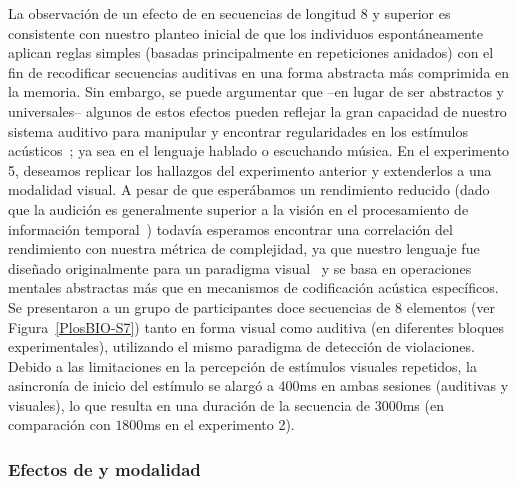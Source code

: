 La observación de un efecto de \mdlbin en secuencias de longitud 8 y superior es consistente con nuestro planteo inicial de que los individuos espontáneamente aplican reglas simples (basadas principalmente en repeticiones anidados) con el fin de recodificar secuencias auditivas en una forma abstracta más comprimida en la memoria. Sin embargo, se puede argumentar que --en lugar de ser abstractos y universales-- algunos de estos efectos pueden reflejar la gran capacidad de nuestro sistema auditivo para manipular y encontrar regularidades en los estímulos acústicos~\cite{f90}; ya sea en el lenguaje hablado o escuchando música. En el experimento 5, deseamos replicar los hallazgos del experimento anterior y extenderlos a una modalidad visual. A pesar de que esperábamos un rendimiento reducido (dado que la audición es generalmente superior a la visión en el procesamiento de información temporal~\cite{f91}) todavía esperamos encontrar una correlación del rendimiento con nuestra métrica de complejidad, ya que nuestro lenguaje fue diseñado originalmente para un paradigma visual~\cite{amalric2017language} y se basa en operaciones mentales abstractas más que en mecanismos de codificación acústica específicos. Se presentaron a un grupo de participantes doce secuencias de 8 elementos (ver Figura~\ref{PlosBIO-S7}) tanto en forma visual como auditiva (en diferentes bloques experimentales), utilizando el mismo paradigma de detección de violaciones. Debido a las limitaciones en la percepción de estímulos visuales repetidos, la asincronía de inicio del estímulo se alargó a $400$ms en ambas sesiones (auditivas y visuales), lo que resulta en una duración de la secuencia de $3000$ms (en comparación con $1800$ms en el experimento 2).

\subsubsection*{Efectos de \mdlbin y modalidad}



